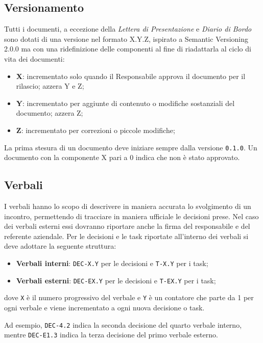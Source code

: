 \subsection{Versionamento}
\label{versionamento}
Tutti i documenti, a eccezione della \textit{Lettera di Presentazione} e \textit{Diario di Bordo} sono dotati di una versione nel formato X.Y.Z, ispirato a Semantic Versioning 2.0.0 ma con una ridefinizione delle componenti al fine di riadattarla al ciclo di vita dei documenti:
\begin{itemize}
	\item \textbf{X}: incrementato solo quando il Responsabile approva il documento per il rilascio; azzera Y e Z;
	\item \textbf{Y}: incrementato per aggiunte di contenuto o modifiche sostanziali del documento; azzera Z;
	\item \textbf{Z}: incrementato per correzioni o piccole modifiche;
\end{itemize}
La prima stesura di un documento deve iniziare sempre dalla versione \texttt{0.1.0}. Un documento con la componente X pari a 0 indica che non è stato approvato.

\subsection{Verbali}
I verbali hanno lo scopo di descrivere in maniera accurata lo svolgimento di un incontro, permettendo di tracciare in maniera ufficiale le decisioni prese. Nel caso dei verbali esterni essi dovranno riportare anche la firma del responsabile e del referente aziendale. 
Per le decisioni e le task riportate all'interno dei verbali si deve adottare la seguente struttura:
\begin{itemize}
	\item \textbf{Verbali interni}: \texttt{DEC-X.Y} per le decisioni e \texttt{T-X.Y} per i task;
	\item \textbf{Verbali esterni}: \texttt{DEC-EX.Y} per le decisioni e \texttt{T-EX.Y} per i task;
\end{itemize}
dove \texttt{X} è il numero progressivo del verbale e \texttt{Y} è un contatore che parte da 1 per ogni verbale e viene incrementato a ogni nuova decisione o task.

Ad esempio, \texttt{DEC-4.2} indica la seconda decisione del quarto verbale interno, mentre \texttt{DEC-E1.3} indica la terza decisione del primo verbale esterno.

